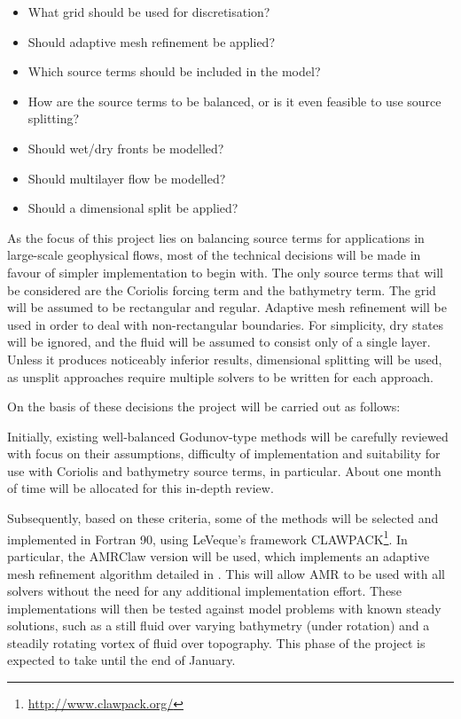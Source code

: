 \documentclass[a4paper,onecolumn,11pt]{article}
\begin{document}
\begin{itemize}
    \item What grid should be used for discretisation?
    \item Should adaptive mesh refinement be applied?
    \item Which source terms should be included in the model?
    \item How are the source terms to be balanced, or is it even feasible to use source splitting?
    \item Should wet/dry fronts be modelled?
    \item Should multilayer flow be modelled?
    \item Should a dimensional split be applied?
\end{itemize}

As the focus of this project lies on balancing source terms for applications in large-scale geophysical flows, most of the technical decisions will be made in favour of simpler implementation to begin with. The only source terms that will be considered are the Coriolis forcing term and the bathymetry term. The grid will be assumed to be rectangular and regular. Adaptive mesh refinement will be used in order to deal with non-rectangular boundaries. For simplicity, dry states will be ignored, and the fluid will be assumed to consist only of a single layer. Unless it produces noticeably inferior results, dimensional splitting will be used, as unsplit approaches require multiple solvers to be written for each approach.

On the basis of these decisions the project will be carried out as follows:

Initially, existing well-balanced Godunov-type methods will be carefully reviewed with focus on their assumptions, difficulty of implementation and suitability for use with Coriolis and bathymetry source terms, in particular. About one month of time will be allocated for this in-depth review.

Subsequently, based on these criteria, some of the methods will be selected and implemented in Fortran 90, using LeVeque's framework CLAWPACK\footnote{\url{http://www.clawpack.org/}}. In particular, the AMRClaw version will be used, which implements an adaptive mesh refinement algorithm detailed in \citet{BergerLeVeque98}. This will allow AMR to be used with all solvers without the need for any additional implementation effort. These implementations will then be tested against model problems with known steady solutions, such as a still fluid over varying bathymetry (under rotation) and a steadily rotating vortex of fluid over topography. This phase of the project is expected to take until the end of January.
\end{document}
